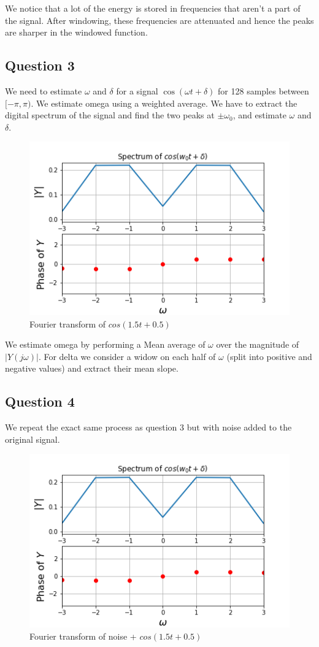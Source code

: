 \documentclass[11pt, a4paper]{article}
\begin{document}
We notice that a lot of the energy is stored in frequencies that aren't a part of the signal. After windowing, these frequencies are attenuated and hence the peaks are sharper in the windowed function. 

\subsection{Question 3}
We need to estimate $\omega$ and $\delta$ for a signal $\cos(\omega t + \delta)$ for 128 samples between $[-\pi,\pi)$. We estimate omega using a weighted average. We have to extract the digital spectrum of the signal and find the two peaks at $\pm\omega_0$, and estimate $\omega$ and $\delta$.
\begin{figure}[h!]
\centering
\includegraphics[scale=0.7]{fig3.png}
\caption{Fourier transform of $cos(1.5t+0.5)$}
\label{fig:universe}
\end{figure}

We estimate omega by performing a Mean average of $\omega$ over the magnitude of $|Y(j\omega)|$.
For delta we consider a widow on each half of $\omega$ (split into positive and negative values) and extract their mean slope. 

\subsection{Question 4}
We repeat the exact same process as question 3 but with noise added to the original signal.
\begin{figure}[h!]
\centering
\includegraphics[scale=0.7]{fig4.png}
\caption{Fourier transform of noise + $cos(1.5t+0.5)$}
\label{fig:universe}
\end{figure}
\end{document}
